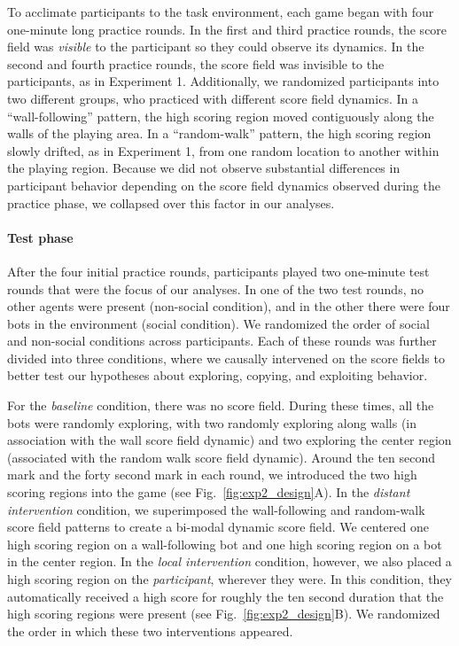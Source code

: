 \documentclass[12pt,letterpaper]{article}
\begin{document}
To acclimate participants to the task environment, each game began with four one-minute long practice rounds. 
In the first and third practice rounds, the score field was \emph{visible} to the participant so they could observe its dynamics.
In the second and fourth practice rounds, the score field was invisible to the participants, as in Experiment 1. 
Additionally, we randomized participants into two different groups, who practiced with different score field dynamics. 
In a ``wall-following'' pattern, the high scoring region moved contiguously along the walls of the playing area. 
In a ``random-walk'' pattern, the high scoring region slowly drifted, as in Experiment 1, from one random location to another within the playing region.
Because we did not observe substantial differences in participant behavior depending on the score field dynamics observed during the practice phase, we collapsed over this factor in our analyses.

\paragraph{Test phase}

After the four initial practice rounds, participants played two one-minute test rounds that were the focus of our analyses. 
In one of the two test rounds, no other agents were present (non-social condition), and in the other there were four bots in the environment (social condition). 
We randomized the order of social and non-social conditions across participants. 
Each of these rounds was further divided into three conditions, where we causally intervened on the score fields to better test our hypotheses about exploring, copying, and exploiting behavior. 

For the \emph{baseline} condition, there was no score field. During these times, all the bots were randomly exploring, with two randomly exploring along walls (in association with the wall score field dynamic) and two exploring the center region (associated with the random walk score field dynamic). 
Around the ten second mark and the forty second mark in each round, we introduced the two high scoring regions into the game (see Fig.~\ref{fig:exp2_design}A).
In the \textit{distant intervention} condition, we superimposed the wall-following and random-walk score field patterns to create a bi-modal dynamic score field. 
We centered one high scoring region on a wall-following bot and one high scoring region on a bot in the center region. 
In the \textit{local intervention} condition, however, we also placed a high scoring region on the \emph{participant}, wherever they were. 
In this condition, they automatically received a high score for roughly the ten second duration that the high scoring regions were present (see Fig.~\ref{fig:exp2_design}B). 
We randomized the order in which these two interventions appeared.
\end{document}
